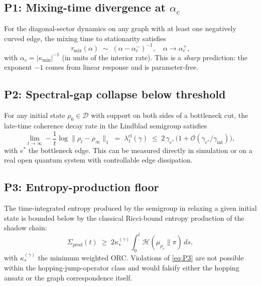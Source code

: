 \documentclass[11pt,letterpaper]{article}
\theoremstyle{definition}
\theoremstyle{remark}
\newcommand{\Diag}{\mathcal{D}}
\begin{document}
\subsection*{P1: Mixing-time divergence at $\alpha_c$}

For the diagonal-sector dynamics on any graph with at least one negatively
curved edge, the mixing time to stationarity satisfies
\begin{equation}
\tau_{\mathrm{mix}}(\alpha) \;\sim\; (\alpha - \alpha_c^{-})^{-1},
\quad \alpha \to \alpha_c^{+},
\label{eq:P1}
\end{equation}
with $\alpha_c = |\kappa_{\mathrm{min}}|^{-1}$ (in units of the interior
rate). This is a \emph{sharp} prediction: the exponent $-1$ comes from
linear response and is parameter-free.

\subsection*{P2: Spectral-gap collapse below threshold}

For any initial state $\rho_0 \in \Diag$ with support on both sides of a
bottleneck cut, the late-time coherence decay rate in the Lindblad semigroup
satisfies
\begin{equation}
\lim_{t\to\infty}
   -\frac{1}{t}\log \|\rho_t - \rho_\infty\|_1
\;=\; \lambda_1^{\mathrm{cl}}(\gamma) \;\le\;
2\,\gamma_{e^*}\,\big(1 + \mathcal{O}(\gamma_{e^*}/\gamma_{\mathrm{int}})\big),
\label{eq:P2}
\end{equation}
with $e^*$ the bottleneck edge. This can be measured directly in simulation
or on a real open quantum system with controllable edge dissipation.

\subsection*{P3: Entropy-production floor}

The time-integrated entropy produced by the semigroup in relaxing a given
initial state is bounded below by the classical Ricci-bound entropy
production of the shadow chain:
\begin{equation}
\Sigma_{\mathrm{prod}}(t) \;\ge\; 2\kappa_*^{(\gamma)} \!\!
   \int_0^t \mathcal{H}(\mu_{\rho_s} \| \pi)\, ds,
\label{eq:P3}
\end{equation}
with $\kappa_*^{(\gamma)}$ the minimum weighted ORC. Violations of
\eqref{eq:P3} are not possible within the hopping-jump-operator class and
would falsify either the hopping ansatz or the graph correspondence itself.
\end{document}
